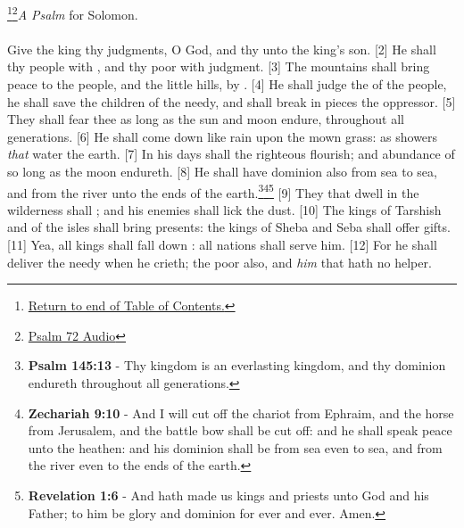 \footnote{\textcolor[cmyk]{0.99998,1,0,0}{\hyperlink{TOC}{Return to end of Table of Contents.}}}\footnote{\href{https://audiobible.com/bible/psalms_72.html}{\textcolor[cmyk]{0.99998,1,0,0}{Psalm 72 Audio}}}\textcolor[cmyk]{0.99998,1,0,0}{\emph{A Psalm} for Solomon.}\\
\\
\textcolor[cmyk]{0.99998,1,0,0}{Give the king thy judgments, O God, and thy  unto the king's son.}
[2] \textcolor[cmyk]{0.99998,1,0,0}{He shall  thy people with , and thy poor with judgment.}
[3] \textcolor[cmyk]{0.99998,1,0,0}{The mountains shall bring peace to the people, and the little hills, by .}
[4] \textcolor[cmyk]{0.99998,1,0,0}{He shall judge the  of the people, he shall save the children of the needy, and shall break in pieces the oppressor.}
[5] \textcolor[cmyk]{0.99998,1,0,0}{They shall fear thee as long as the sun and moon endure, throughout all generations.}
[6] \textcolor[cmyk]{0.99998,1,0,0}{He shall come down like rain upon the mown grass: as showers \emph{that} water the earth.}
[7] \textcolor[cmyk]{0.99998,1,0,0}{In his days shall the righteous flourish; and abundance of  so long as the moon endureth.}
[8] \textcolor[cmyk]{0.99998,1,0,0}{He shall have dominion also from sea to sea, and from the river unto the ends of the earth.}\footnote{\textbf{Psalm 145:13} - Thy kingdom is an everlasting kingdom, and thy dominion endureth throughout all generations.}\footnote{\textbf{Zechariah 9:10} - And I will cut off the chariot from Ephraim, and the horse from Jerusalem, and the battle bow shall be cut off: and he shall speak peace unto the heathen: and his dominion shall be from sea even to sea, and from the river even to the ends of the earth.}\footnote{\textbf{Revelation 1:6} - And hath made us kings and priests unto God and his Father; to him be glory and dominion for ever and ever. Amen.}
[9] \textcolor[cmyk]{0.99998,1,0,0}{They that dwell in the wilderness shall ; and his enemies shall lick the dust.}
[10] \textcolor[cmyk]{0.99998,1,0,0}{The kings of Tarshish and of the isles shall bring presents: the kings of Sheba and Seba shall offer gifts.}
[11] \textcolor[cmyk]{0.99998,1,0,0}{Yea, all kings shall fall down : all nations shall serve him.}
[12] \textcolor[cmyk]{0.99998,1,0,0}{For he shall deliver the needy when he crieth; the poor also, and \emph{him} that hath no helper.}
